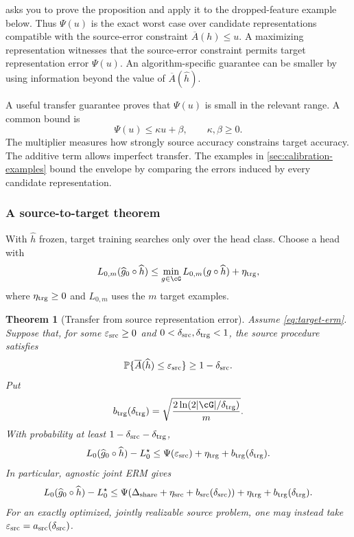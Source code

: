 \documentclass[11pt,twoside]{article}
\renewcommand{\P}{\mathbb P}
\newtheorem{theorem}{Theorem}[section]
\theoremstyle{definition}
\theoremstyle{remark}
\begin{document}
 asks you to prove the proposition and apply
it to the dropped-feature example below. Thus $\Psi(u)$ is the exact worst
case over candidate representations compatible with the source-error
constraint $\overline A(h)\le u$. A maximizing representation witnesses that
the source-error constraint permits target representation error $\Psi(u)$.
An algorithm-specific guarantee can be smaller by using information beyond
the value of $\overline A(\widehat h)$.

A useful transfer guarantee proves that $\Psi(u)$ is small in the relevant
range. A common bound is
\begin{equation}
 \Psi(u)\le\kappa u+\beta,
 \qquad \kappa,\beta\ge0.
 \label{eq:linear-calibration}
\end{equation}
The multiplier measures how strongly source accuracy constrains target
accuracy. The additive term allows imperfect transfer.
The examples in \cref{sec:calibration-examples} bound the envelope by
comparing the errors induced by every candidate representation.

\subsubsection{A source-to-target theorem}

With $\widehat h$ frozen, target training searches only over the head class.
Choose a head with
\begin{equation}
 L_{0,m}(\widehat g_0\circ\widehat h)
 \le\min_{g\in\cG}L_{0,m}(g\circ\widehat h)+\eta_{\rm trg},
 \label{eq:target-erm}
\end{equation}
where $\eta_{\rm trg}\ge0$ and $L_{0,m}$ uses the $m$ target examples.

\begin{theorem}[Transfer from source representation error]
\label{thm:calibrated-transfer}
Assume \cref{eq:target-erm}. Suppose that, for some
$\varepsilon_{\rm src}\ge0$ and $0<\delta_{\rm src},\delta_{\rm trg}<1$,
the source procedure satisfies
\[
 \P\{\overline A(\widehat h)\le\varepsilon_{\rm src}\}
 \ge1-\delta_{\rm src}.
\]
Put
\[
 b_{\rm trg}(\delta_{\rm trg})
 =\sqrt{\frac{2\ln(2|\cG|/\delta_{\rm trg})}m}.
\]
With probability at least $1-\delta_{\rm src}-\delta_{\rm trg}$,
\begin{equation}
 L_0(\widehat g_0\circ\widehat h)-L_0^\star
 \le\Psi(\varepsilon_{\rm src})
     +\eta_{\rm trg}+b_{\rm trg}(\delta_{\rm trg}).
 \label{eq:general-transfer}
\end{equation}
In particular, agnostic joint ERM gives
\begin{equation}
 L_0(\widehat g_0\circ\widehat h)-L_0^\star
 \le
 \Psi\!\left(
   \Delta_{\rm share}+\eta_{\rm src}
   +b_{\rm src}(\delta_{\rm src})\right)
 +\eta_{\rm trg}+b_{\rm trg}(\delta_{\rm trg}).
 \label{eq:erm-transfer}
\end{equation}
For an exactly optimized, jointly realizable source problem, one may
instead take
$\varepsilon_{\rm src}=a_{\rm src}(\delta_{\rm src})$.
\end{theorem}
\end{document}
